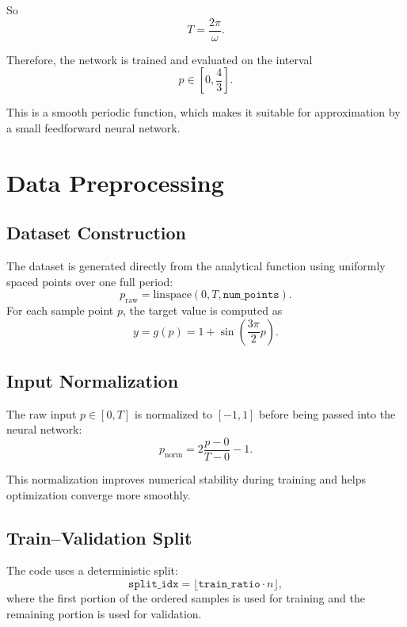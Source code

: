 \documentclass[11pt]{article}
\begin{document}
So \begin{equation}
T = \frac{2\pi}{\omega}.
\end{equation}

Therefore, the network is trained and evaluated on the interval
\begin{equation}
p \in \left[0,\frac{4}{3}\right].
\end{equation}

This is a smooth periodic function, which makes it suitable for approximation by a small feedforward neural network.

\section{Data Preprocessing}

\subsection{Dataset Construction}

The dataset is generated directly from the analytical function using uniformly spaced points over one full period:
\begin{equation}
p_{\text{raw}} = \text{linspace}(0,T,\texttt{num\_points}).
\end{equation}
For each sample point $p$, the target value is computed as
\begin{equation}
y = g(p) = 1 + \sin\left(\frac{3\pi}{2}p\right).
\end{equation}

\subsection{Input Normalization}

The raw input $p \in [0,T]$ is normalized to $[-1,1]$ before being passed into the neural network:
\begin{equation}
p_{\text{norm}} = 2\frac{p-0}{T-0} - 1.
\end{equation}

This normalization improves numerical stability during training and helps optimization converge more smoothly.

\subsection{Train--Validation Split}

The code uses a deterministic split:
\begin{equation}
\texttt{split\_idx} = \lfloor \texttt{train\_ratio} \cdot n \rfloor,
\end{equation}
where the first portion of the ordered samples is used for training and the remaining portion is used for validation.
\end{document}
